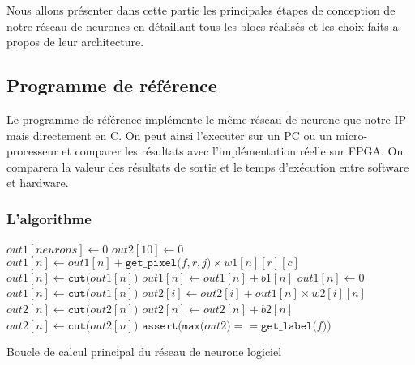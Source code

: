 
Nous allons présenter dans cette partie les principales étapes de conception
de notre réseau de neurones en détaillant tous les blocs réalisés et les choix
faits a propos de leur architecture.

\subsection{Programme de référence}
Le programme de référence implémente le même réseau de neurone que notre IP
mais directement en C. On peut ainsi l'executer sur un PC ou un micro-processeur 
et comparer les résultats avec l'implémentation réelle sur FPGA. On comparera
la valeur des résultats de sortie et le temps d'exécution entre software et
hardware.

\subsubsection{L'algorithme}

\begin{algorithm}
	\SetAlgoLined
	 {
		$out1[neurons] \leftarrow 0$\;
		$out2[10] \leftarrow 0$\;
		 {
			 {
				 {
					$out1[n] \leftarrow out1[n] + \texttt{get\_pixel(}f, r, j\texttt{)} \times w1[n][r][c]$\;
				}
			}
		}
		 {
			$out1[n] \leftarrow \texttt{cut(}out1[n]\texttt{)}$\;
			$out1[n] \leftarrow out1[n] + b1[n]$\;
			 {
				$out1[n] \leftarrow 0$\;
			}
			$out1[n] \leftarrow \texttt{cut(}out1[n]\texttt{)}$\;
		}
		 {
			 {
				$out2[i] \leftarrow out2[i] + out1[n] \times w2[i][n]$\;
			}
		}
		 {
			$out2[n] \leftarrow \texttt{cut(}out2[n]\texttt{)}$\;
			$out2[n] \leftarrow out2[n] + b2[n]$\;
			$out2[n] \leftarrow \texttt{cut(}out2[n]\texttt{)}$\;
		}
		$\texttt{assert(max(}out2\texttt{)} == \texttt{get\_label(}f\texttt{))}$\;
	}
	\caption{Boucle de calcul principal du réseau de neurone logiciel}
	\label{fig:soft_nn}
\end{algorithm}

